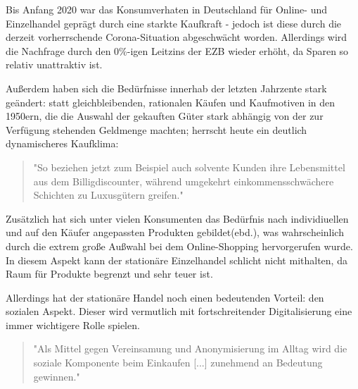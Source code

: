 \iffalse
Einteilung in: Online-Marktplätze + Online-Händler, Intermediäre, Kataloversender, stationäre Händler, Hersteller/Marken \cite{Graf}

entwicklung des kaufprozesses: graf:abbildung; 

https://edoc.sub.uni-hamburg.de/hcu/volltexte/2017/370/pdf/Ebert_Kirsten.pdf Anfang

änderung kaufablauf: \cite{Schaefers}
\fi



Bis Anfang 2020 war das Konsumverhaten in Deutschland für Online- und Einzelhandel geprägt durch eine starkte Kaufkraft - jedoch ist diese durch die derzeit vorherrschende Corona-Situation abgeschwächt worden\cite{BfWE}. Allerdings wird die Nachfrage durch den 0\%-igen Leitzins der \ac{EZB} wieder erhöht, da Sparen so relativ unattraktiv ist\cite[S. 49]{Ebert}.

Außerdem haben sich die Bedürfnisse innerhab der letzten Jahrzente stark geändert: statt gleichbleibenden, rationalen Käufen und Kaufmotiven in den 1950ern, die die Auswahl der gekauften Güter stark abhängig von der zur Verfügung stehenden Geldmenge machten\cite[S. 38]{Schramm}; herrscht heute ein deutlich dynamischeres Kaufklima:
\begin{quote}
"So beziehen jetzt zum Beispiel auch solvente Kunden ihre Lebensmittel aus dem Billigdiscounter, während  umgekehrt  einkommensschwächere  Schichten  zu  Luxusgütern  greifen."\cite[S. 43]{Nitt}
\end{quote}

Zusätzlich hat sich unter vielen Konsumenten das Bedürfnis nach individiuellen und auf den Käufer angepassten Produkten gebildet(ebd.), was wahrscheinlich durch die extrem große Außwahl bei dem Online-Shopping hervorgerufen wurde. In diesem Aspekt kann der stationäre Einzelhandel schlicht nicht mithalten, da Raum für Produkte begrenzt und sehr teuer ist.
\iffalse
Auch in anderen Aspekten ist der Onlinehandel stationären Geschäften überlegen

> billig - strategie vorallem von amazon und alibaba
\fi
Allerdings hat der stationäre Handel noch einen bedeutenden Vorteil: den sozialen Aspekt. Dieser wird vermutlich mit fortschreitender Digitalisierung eine immer wichtigere Rolle spielen\cite[S. 50]{Ebert}.
\begin{quote}
"Als Mittel gegen Vereinsamung und Anonymisierung im Alltag wird die soziale Komponente beim Einkaufen [...] zunehmend an Bedeutung gewinnen."\cite[S. 43]{Nitt}
\end{quote}
